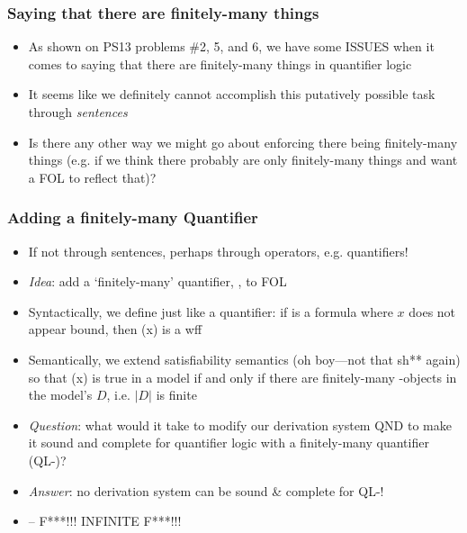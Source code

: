 \begin{frame}
\frametitle{Saying that there are finitely-many things}

\begin{itemize}[<+->]

\item As shown on PS13 problems \#2, 5, and 6, we have some ISSUES when it comes to saying that there are finitely-many things in quantifier logic

\item It seems like we definitely cannot accomplish this putatively possible task through  \textit{sentences}

\item Is there any other way we might go about enforcing there being finitely-many things (e.g. if we think there probably are only finitely-many things and want a FOL to reflect that)?

\end{itemize}
\end{frame}

\begin{frame}
\frametitle{Adding a finitely-many Quantifier}

\begin{itemize}[<+->]

\item If not through sentences, perhaps through operators, e.g. quantifiers!

\item \textit{Idea}: add a `finitely-many' quantifier, , to FOL

\item Syntactically, we define  just like a quantifier: if  is a formula where $x$ does not appear bound, then (x) is a wff

\item Semantically, we extend satisfiability semantics (oh boy---not that sh** again) so that (x) is true in a model if and only if there are finitely-many -objects in the model's $D$, i.e. $|D|$ is finite

\item \emph{Question}: what would it take to modify our derivation system QND to make it sound and complete for quantifier logic with a finitely-many quantifier (QL-)?

\item \emph{Answer}: no derivation system can be sound 
\& complete for QL-!


\item[] -- F***!!! INFINITE F***!!!

\end{itemize}
\end{frame}

